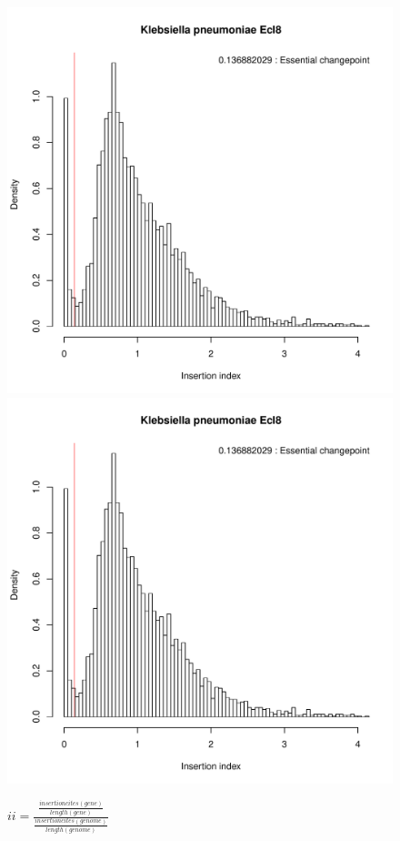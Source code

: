 \documentclass[a4paper,10pt]{article}
\begin{document}
\begin{figure}
\includegraphics[scale=0.2, page=11]{mixtools-10.pdf}
\includegraphics[scale=0.2, page=12]{mixtools-10.pdf}
\caption{$ii=\frac{\frac{insertioncites(gene)}{length(gene)}}{\frac{insertioncites(genome)}{length(genome)}}$\newline
}
\end{figure}
\end{document}
